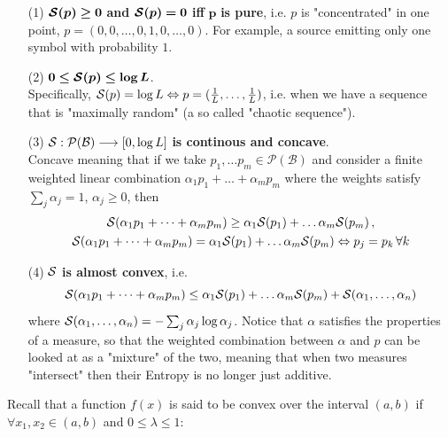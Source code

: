 \begin{prop}
\label{prop:entropy_properties}
\hfill
\begin{itemize}
    \item[(1)]  $\bm{\mathcal{S}(p) \geq 0}$ \textbf{and} $\bm{\mathcal{S}(p) = 0}$ \textbf{iff} $\bm{p}$  \textbf{is pure}, i.e. $p$ is "concentrated" in one point, $p= (0,0, \dots, 0,1,0, \dots, 0)$. For example, a source emitting only one symbol with probability $1$.
    \item[(2)] $\bm{0 \leq \mathcal{S}(p) \leq \log L}$. \\Specifically, $\mathcal{S}(p) = \log L \Leftrightarrow p= (\frac{1}{L}, \dots, \frac{1}{L})$, i.e. when we have a sequence that is "maximally random" (a so called "chaotic sequence").
    \item[(3)] $\mathcal{S}: \mathcal{P(\mathcal{B})} \longrightarrow [0, \log L]$ \textbf{is continous and concave}. 
    \\Concave meaning that if we take $p_1, \dots p_m \in \mathcal{P(\mathcal{B})}$ and consider a finite weighted linear combination $\alpha_1 p_1 + \dots + \alpha_m p_m$ where the weights satisfy $\sum_j \alpha_j = 1$, $\alpha_j \geq 0$, then
    \begin{gather}
        \label{eq:concavity_of_entropy}
        \mathcal{S} (\alpha_1 p_1 + \dots + \alpha_m p_m) \geq \alpha_1 \mathcal{S} (p_1) + \dots  \alpha_m \mathcal{S} (p_m) \nonumber \, ,\\
        \mathcal{S} (\alpha_1 p_1 + \dots + \alpha_m p_m) = \alpha_1 \mathcal{S} (p_1) + \dots  \alpha_m \mathcal{S} (p_m) \Leftrightarrow p_j=p_k \, \forall k
    \end{gather}
    
    \item[(4)] $\mathcal{S}$ \textbf{is almost convex}, i.e. 
    \begin{equation}
        \mathcal{S} (\alpha_1 p_1 + \dots + \alpha_m p_m) \leq \alpha_1 \mathcal{S} (p_1) + \dots  \alpha_m \mathcal{S} (p_m) + \mathcal{S} (\alpha_1, \dots, \alpha_n)
    \end{equation}
    where $\mathcal{S} (\alpha_1, \dots, \alpha_n) = - \sum_j \alpha_j \log \alpha_j$.
    Notice that $\alpha$ satisfies the properties of a measure, so that the weighted combination between $\alpha$ and $p$ can be looked at as a "mixture" of the two, meaning that when two measures "intersect" then their Entropy is no longer just additive.
\end{itemize}
\end{prop}
Recall that a function $f(x)$ is said to be convex over the interval $(a, b)$ if $\forall x_1, x_2 \in (a, b)$ and $0 \leq \lambda \leq 1$:
